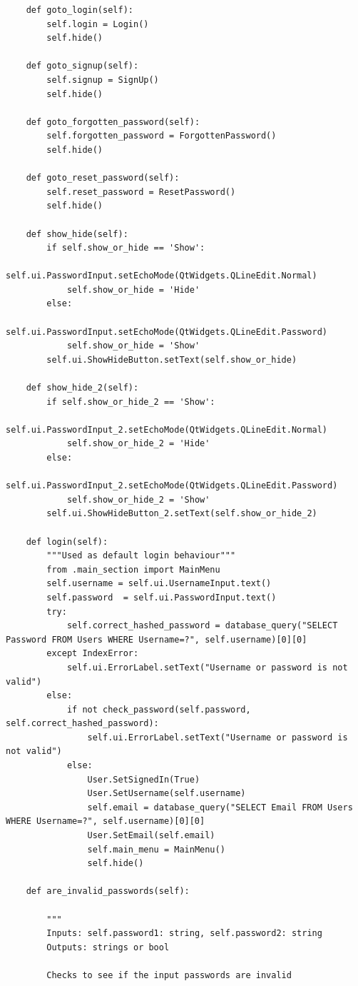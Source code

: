 \documentclass{article}
\begin{document}
\begin{lstlisting}
    def goto_login(self):
        self.login = Login()
        self.hide()

    def goto_signup(self):
        self.signup = SignUp()
        self.hide()

    def goto_forgotten_password(self):
        self.forgotten_password = ForgottenPassword()
        self.hide()

    def goto_reset_password(self):
        self.reset_password = ResetPassword()
        self.hide()

    def show_hide(self):
        if self.show_or_hide == 'Show':
            self.ui.PasswordInput.setEchoMode(QtWidgets.QLineEdit.Normal)
            self.show_or_hide = 'Hide'
        else:
            self.ui.PasswordInput.setEchoMode(QtWidgets.QLineEdit.Password)
            self.show_or_hide = 'Show'
        self.ui.ShowHideButton.setText(self.show_or_hide)

    def show_hide_2(self):
        if self.show_or_hide_2 == 'Show':
            self.ui.PasswordInput_2.setEchoMode(QtWidgets.QLineEdit.Normal)
            self.show_or_hide_2 = 'Hide'
        else:
            self.ui.PasswordInput_2.setEchoMode(QtWidgets.QLineEdit.Password)
            self.show_or_hide_2 = 'Show'
        self.ui.ShowHideButton_2.setText(self.show_or_hide_2)

    def login(self):
        """Used as default login behaviour"""
        from .main_section import MainMenu
        self.username = self.ui.UsernameInput.text()
        self.password  = self.ui.PasswordInput.text()
        try:
            self.correct_hashed_password = database_query("SELECT Password FROM Users WHERE Username=?", self.username)[0][0]
        except IndexError:
            self.ui.ErrorLabel.setText("Username or password is not valid")
        else:
            if not check_password(self.password, self.correct_hashed_password):
                self.ui.ErrorLabel.setText("Username or password is not valid")
            else:
                User.SetSignedIn(True)
                User.SetUsername(self.username)
                self.email = database_query("SELECT Email FROM Users WHERE Username=?", self.username)[0][0]
                User.SetEmail(self.email)
                self.main_menu = MainMenu()
                self.hide()

    def are_invalid_passwords(self):

        """
        Inputs: self.password1: string, self.password2: string
        Outputs: strings or bool

        Checks to see if the input passwords are invalid


\end{lstlisting}
\end{document}
